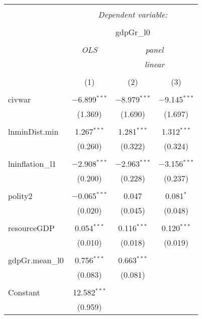 \begin{table}[!htbp] \centering 
  \caption{} 
  \label{} 
\begin{tabular}{@{\extracolsep{5pt}}lccc} 
\\[-1.8ex]\hline 
\hline \\[-1.8ex] 
 & \multicolumn{3}{c}{\textit{Dependent variable:}} \\ 
\cline{2-4} 
\\[-1.8ex] & \multicolumn{3}{c}{gdpGr\_l0} \\ 
\\[-1.8ex] & \textit{OLS} & \multicolumn{2}{c}{\textit{panel}} \\ 
 & \textit{} & \multicolumn{2}{c}{\textit{linear}} \\ 
\\[-1.8ex] & (1) & (2) & (3)\\ 
\hline \\[-1.8ex] 
 civwar & $-$6.899$^{***}$ & $-$8.979$^{***}$ & $-$9.145$^{***}$ \\ 
  & (1.369) & (1.690) & (1.697) \\ 
  & & & \\ 
 lnminDist.min & 1.267$^{***}$ & 1.281$^{***}$ & 1.312$^{***}$ \\ 
  & (0.260) & (0.322) & (0.324) \\ 
  & & & \\ 
 lninflation\_l1 & $-$2.908$^{***}$ & $-$2.963$^{***}$ & $-$3.156$^{***}$ \\ 
  & (0.200) & (0.228) & (0.237) \\ 
  & & & \\ 
 polity2 & $-$0.065$^{***}$ & 0.047 & 0.081$^{*}$ \\ 
  & (0.020) & (0.045) & (0.048) \\ 
  & & & \\ 
 resourceGDP & 0.054$^{***}$ & 0.116$^{***}$ & 0.120$^{***}$ \\ 
  & (0.010) & (0.018) & (0.019) \\ 
  & & & \\ 
 gdpGr.mean\_l0 & 0.756$^{***}$ & 0.663$^{***}$ &  \\ 
  & (0.083) & (0.081) &  \\ 
  & & & \\ 
 Constant & 12.582$^{***}$ &  &  \\ 
  & (0.959) &  &  \\ 

\end{tabular}
\end{table}

